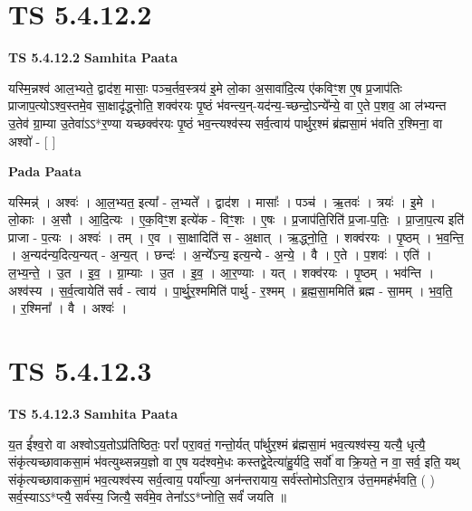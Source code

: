 \documentclass[17pt]{extarticle}
\begin{document}

\section{ TS 5.4.12.2 }

\textbf{TS 5.4.12.2 } \newline
\textbf{Samhita Paata} \newline

यस्मि॒न्नश्व॑ आल॒भ्यते॒ द्वाद॑श॒ मासाः॒ पञ्च॒र्तव॒स्त्रय॑ इ॒मे लो॒का अ॒सावा॑दि॒त्य ए॑कविꣳ॒॒श ए॒ष प्र॒जाप॑तिः प्राजाप॒त्योऽश्व॒स्तमे॒व सा॒क्षादृ॑द्ध्नोति॒ शक्व॑रयः पृ॒ष्ठं भ॑वन्त्य॒न्-यद॑न्य॒-च्छन्दो॒ऽन्ये᳚न्ये॒ वा ए॒ते प॒शव॒ आ ल॑भ्यन्त उ॒तेव॑ ग्रा॒म्या उ॒तेवा॑ऽऽ*र॒ण्या यच्छक्व॑रयः पृ॒ष्ठं भव॒न्त्यश्व॑स्य सर्व॒त्वाय॑ पार्थुर॒श्मं ब्र॑ह्मसा॒मं भ॑वति र॒श्मिना॒ वा अश्वो॑ - [  ] \newline

\textbf{Pada Paata} \newline

यस्मिन्न्॑ । अश्वः॑ । आ॒ल॒भ्यत॒ इत्या᳚ - ल॒भ्यते᳚ । द्वाद॑श । मासाः᳚ । पञ्च॑ । ऋ॒तवः॑ । त्रयः॑ । इ॒मे । लो॒काः । अ॒सौ । आ॒दि॒त्यः । ए॒क॒विꣳ॒॒श इत्ये॑क - विꣳ॒॒शः । ए॒षः । प्र॒जाप॑ति॒रिति॑ प्र॒जा-प॒तिः॒ । प्रा॒जा॒प॒त्य इति॑ प्राजा - प॒त्यः । अश्वः॑ । तम् । ए॒व । सा॒क्षादिति॑ स - अ॒क्षात् । ऋ॒द्ध्नो॒ति॒ । शक्व॑रयः । पृ॒ष्ठम् । भ॒व॒न्ति॒ । अ॒न्यद॑न्य॒दित्य॒न्यत् - अ॒न्य॒त् । छन्दः॑ । अ॒न्ये᳚ऽन्य॒ इत्य॒न्ये - अ॒न्ये॒ । वै । ए॒ते । प॒शवः॑ । एति॑ । ल॒भ्य॒न्ते॒ । उ॒त । इ॒व॒ । ग्रा॒म्याः । उ॒त । इ॒व॒ । आ॒र॒ण्याः । यत् । शक्व॑रयः । पृ॒ष्ठम् । भव॑न्ति । अश्व॑स्य । स॒र्व॒त्वायेति॑ सर्व - त्वाय॑ । पा॒र्थु॒र॒श्ममिति॑ पार्थु - र॒श्मम् । ब्र॒ह्म॒सा॒ममिति॑ ब्रह्म - सा॒मम् । भ॒व॒ति॒ । र॒श्मिना᳚ । वै । अश्वः॑ ।  \newline





\section{ TS 5.4.12.3 }

\textbf{TS 5.4.12.3 } \newline
\textbf{Samhita Paata} \newline

य॒त ई᳚श्व॒रो वा अश्वोऽय॒तोऽप्र॑तिष्ठितः॒ परां᳚ परा॒वतं॒ गन्तो॒र्यत् पा᳚र्थुर॒श्मं ब्र॑ह्मसा॒मं भव॒त्यश्व॑स्य॒ यत्यै॒ धृत्यै॒ संकृ॑त्यच्छावाकसा॒मं भ॑वत्युथ्सन्नय॒ज्ञो वा ए॒ष यद॑श्वमे॒धः कस्तद्वे॒देत्या॑हु॒र्यदि॒ सर्वो॑ वा क्रि॒यते॒ न वा॒ सर्व॒ इति॒ यथ् संकृ॑त्यच्छावाकसा॒मं भव॒त्यश्व॑स्य सर्व॒त्वाय॒ पर्या᳚प्त्या॒ अन॑न्तरायाय॒ सर्व॑स्तोमोऽतिरा॒त्र उ॑त्त॒ममह॑र्भवति॒ ( ) सर्व॒स्याऽऽ*प्त्यै॒ सर्व॑स्य॒ जित्यै॒ सर्व॑मे॒व तेना᳚ऽऽ*प्नोति॒ सर्वं॑ जयति ॥ \newline
\end{document}
